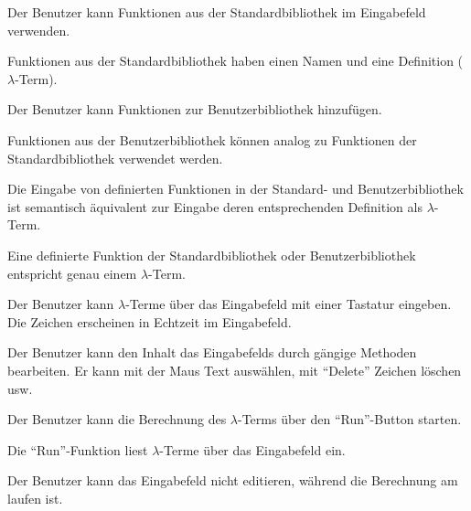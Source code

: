 \documentclass[parskip=full,11pt,twoside]{scrartcl}
\begin{document}
Der Benutzer kann Funktionen aus der Standardbibliothek im Eingabefeld verwenden.

Funktionen aus der Standardbibliothek haben einen Namen und eine Definition ($\lambda$-Term).

Der Benutzer kann Funktionen zur Benutzerbibliothek hinzufügen.

Funktionen aus der Benutzerbibliothek können analog zu Funktionen der Standardbibliothek verwendet werden.

Die Eingabe von definierten Funktionen in der Standard- und Benutzerbibliothek ist semantisch äquivalent zur Eingabe deren entsprechenden Definition als $\lambda$-Term.

Eine definierte Funktion der Standardbibliothek oder Benutzerbibliothek entspricht genau einem $\lambda$-Term.

Der Benutzer kann $\lambda$-Terme über das Eingabefeld mit einer Tastatur eingeben. Die Zeichen erscheinen in Echtzeit im Eingabefeld.

Der Benutzer kann den Inhalt das Eingabefelds durch gängige Methoden bearbeiten.
Er kann mit der Maus Text auswählen, mit \enquote{Delete} Zeichen löschen usw.

Der Benutzer kann die Berechnung des $\lambda$-Terms über den \enquote{Run}-Button starten.

Die \enquote{Run}-Funktion liest $\lambda$-Terme über das Eingabefeld ein.

Der Benutzer kann das Eingabefeld nicht editieren, während die Berechnung am laufen ist.
\end{document}
